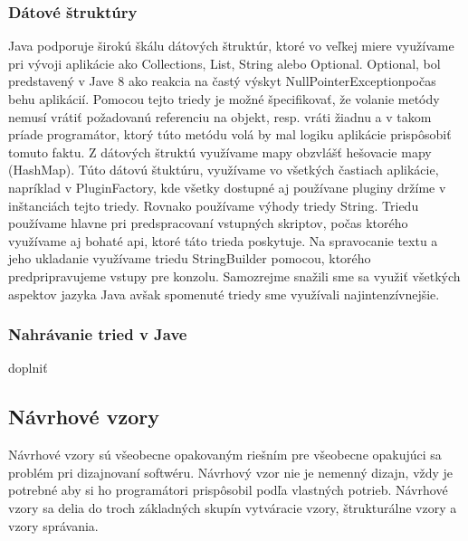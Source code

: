 \subsubsection{Dátové štruktúry}
\indent Java podporuje širokú škálu dátových štruktúr, ktoré vo veľkej miere využívame pri vývoji aplikácie ako Collections, List, String alebo Optional. \newline
\indent Optional, bol predstavený v Jave 8 ako reakcia na častý výskyt NullPointerExceptionpočas behu aplikácií. \cite{javabook}  Pomocou tejto triedy je možné špecifikovať, že volanie metódy nemusí vrátiť požadovanú referenciu na objekt, resp. vráti žiadnu a v takom príade programátor, ktorý túto metódu volá by mal logiku aplikácie prispôsobiť tomuto faktu.
\newline
\indent Z dátových štruktú využívame mapy obzvlášť hešovacie mapy (HashMap). Túto dátovú štuktúru, využívame vo všetkých častiach aplikácie, napríklad v PluginFactory, kde všetky dostupné aj používane pluginy držíme v inštanciách tejto triedy.
\newline
\indent Rovnako používame  výhody triedy String. Triedu používame hlavne pri predspracovaní vstupných skriptov, počas ktorého využívame aj bohaté \acrshort{api}, ktoré táto trieda poskytuje. Na spravocanie textu a jeho ukladanie využívame triedu StringBuilder pomocou, ktorého predpripravujeme vstupy pre konzolu. 
\newline
\indent Samozrejme snažili sme sa využiť všetkých aspektov jazyka Java avšak spomenuté triedy sme využívali najintenzívnejšie.

\subsubsection{Nahrávanie tried v Jave}
\indent doplniť

\subsection{Návrhové vzory}
\indent Návrhové vzory sú všeobecne opakovaným riešním pre všeobecne opakujúci sa problém pri dizajnovaní softwéru. Návrhový vzor nie je nemenný dizajn, vždy je potrebné aby si ho programátori prispôsobil podľa vlastných potrieb. Návrhové vzory sa delia do troch základných skupín vytváracie vzory, štrukturálne vzory a vzory správania. \cite{designpattern}

